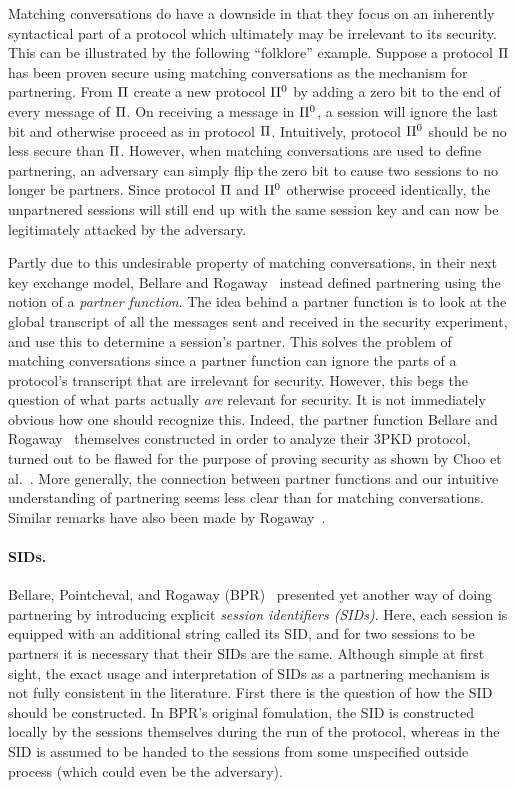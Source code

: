 Matching conversations do have a downside in that they focus on an inherently syntactical part of a protocol
which ultimately may be irrelevant to its security.
This can be illustrated by the following ``folklore'' example.
Suppose a protocol $\mathrm{\Pi}$ has been proven secure using matching conversations as the mechanism for partnering.
From $\mathrm{\Pi}$ create a new protocol $\mathrm{\Pi}^0$ by adding a zero bit to the end of every message of $\mathrm{\Pi}$.
On receiving a message in $\mathrm{\Pi}^0$,
a session will ignore the last bit and otherwise proceed as in protocol $\mathrm{\Pi}$.
Intuitively,
protocol $\mathrm{\Pi}^0$ should be no less secure than $\mathrm{\Pi}$.
However,
when matching conversations are used to define partnering,
an adversary can simply flip the zero bit to cause two sessions to no longer be partners.
Since protocol $\mathrm{\Pi}$ and $\mathrm{\Pi}^0$ otherwise proceed identically,
the unpartnered sessions will still end up with the same session key and can now  be legitimately attacked by the adversary.

Partly due to this undesirable property of matching conversations,
in their next key exchange model,
Bellare and Rogaway~\cite{STOC:BelRog95} instead defined partnering using the notion of a \emph{partner function}. 
The idea behind a partner function is to look at the global transcript of all the messages sent and received in the security experiment,
and use this to determine a session's partner.
This solves the problem of matching conversations since a partner function can ignore the parts of a protocol's transcript that are irrelevant for security.
However,
this begs the question of what parts actually \emph{are} relevant for security.
It is not immediately obvious how one should recognize this. 
Indeed,
the partner function  Bellare and Rogaway~\cite{STOC:BelRog95} themselves constructed in order to analyze their 3PKD protocol, turned out to be flawed for the purpose of proving security
as shown by Choo et al.~\cite{SCN:CBHM04,ACISP:ChoHit05}.
More generally,
the connection between partner functions and our intuitive understanding of partnering seems less clear than for matching conversations.
Similar remarks have also been made by Rogaway~\cite[§6]{Rogaway:2004:role_of_definitions}.


\paragraph{SIDs.}
Bellare, Pointcheval, and Rogaway (BPR)~\cite{EC:BelPoiRog00} presented  yet another way of doing partnering by introducing explicit \emph{session identifiers (SIDs)}.
Here,
each session is equipped with an additional string called its SID,
and for two sessions to be partners it is necessary that their SIDs are the same. 
Although simple at first sight,
the exact usage and interpretation of SIDs as a partnering mechanism is not fully consistent in the literature.
First there is the question of how the SID should be constructed.
In BPR's original fomulation,
the SID is constructed locally by the sessions themselves during the run of the protocol,
whereas in \cite{EC:CanKra01,C:CanKra02} the SID is assumed to be handed to the sessions from some unspecified outside process (which could even be the adversary).

